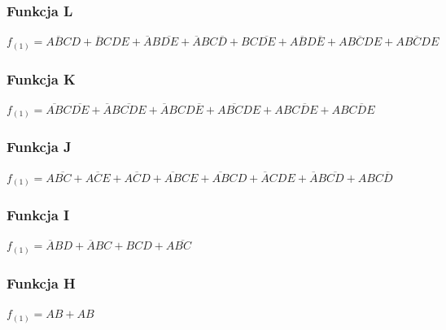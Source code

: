 \documentclass[a4paper]{article}
\begin{document}

\subsubsection{Funkcja L}
\begin{center}
  $f_{(1)} = 
  {\overline{ABC}D} + 
  {\overline{B}CDE} +
  {\overline{A}B\overline{DE}} +
  {\overline{A}BC\overline{D}} +
  {BC\overline{DE}} +
  {A\overline{B}D\overline{E}} +
  {A\overline{BCD}E} +
  {AB\overline{C}DE} $
\end{center}


\subsubsection{Funkcja K}
\begin{center}
  $f_{(1)} =
  {\overline{AB}C\overline{DE}} +
  {\overline{A}B\overline{CD}E} +
  {\overline{A}BCD\overline{E}} +
  {A\overline{BC}DE} +
  {AB\overline{CDE}} +
  {ABC\overline{D}E} $
\end{center}


\subsubsection{Funkcja J}
\begin{center}
  $f_{(1)} = 
  {A\overline{BC}} +
  {A\overline{C}E} +
  {A\overline{C}D} +
  {\overline{AB}CE} +
  {\overline{AB}CD} +
  {\overline{A}CDE} +
  {\overline{A}B\overline{CD}} +
  {ABC\overline{D}} $
\end{center}


\subsubsection{Funkcja I}
\begin{center}
  $f_{(1)} = 
  {\overline{A}BD} +
  {\overline{A}BC} +
  {BCD} +
  {A\overline{BC}} $
\end{center}


\subsubsection{Funkcja H}
\begin{center}
  $f_{(1)} = {AB} + {AB} $
\end{center}
\end{document}
